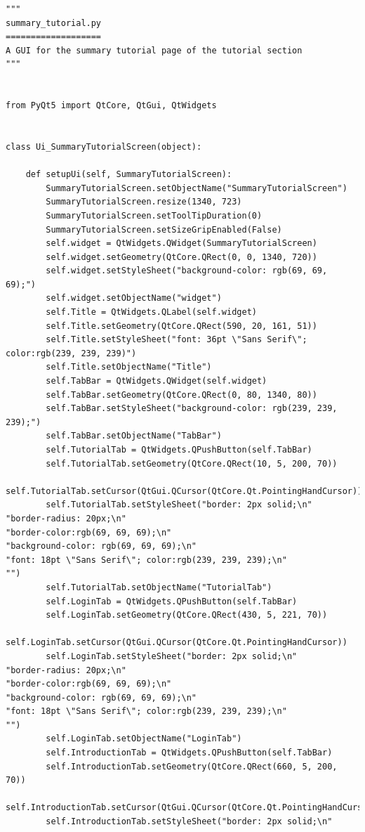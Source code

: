 \documentclass{article}
\begin{document}
\begin{lstlisting}
"""
summary_tutorial.py
===================
A GUI for the summary tutorial page of the tutorial section
"""


from PyQt5 import QtCore, QtGui, QtWidgets


class Ui_SummaryTutorialScreen(object):

    def setupUi(self, SummaryTutorialScreen):
        SummaryTutorialScreen.setObjectName("SummaryTutorialScreen")
        SummaryTutorialScreen.resize(1340, 723)
        SummaryTutorialScreen.setToolTipDuration(0)
        SummaryTutorialScreen.setSizeGripEnabled(False)
        self.widget = QtWidgets.QWidget(SummaryTutorialScreen)
        self.widget.setGeometry(QtCore.QRect(0, 0, 1340, 720))
        self.widget.setStyleSheet("background-color: rgb(69, 69, 69);")
        self.widget.setObjectName("widget")
        self.Title = QtWidgets.QLabel(self.widget)
        self.Title.setGeometry(QtCore.QRect(590, 20, 161, 51))
        self.Title.setStyleSheet("font: 36pt \"Sans Serif\"; color:rgb(239, 239, 239)")
        self.Title.setObjectName("Title")
        self.TabBar = QtWidgets.QWidget(self.widget)
        self.TabBar.setGeometry(QtCore.QRect(0, 80, 1340, 80))
        self.TabBar.setStyleSheet("background-color: rgb(239, 239, 239);")
        self.TabBar.setObjectName("TabBar")
        self.TutorialTab = QtWidgets.QPushButton(self.TabBar)
        self.TutorialTab.setGeometry(QtCore.QRect(10, 5, 200, 70))
        self.TutorialTab.setCursor(QtGui.QCursor(QtCore.Qt.PointingHandCursor))
        self.TutorialTab.setStyleSheet("border: 2px solid;\n"
"border-radius: 20px;\n"
"border-color:rgb(69, 69, 69);\n"
"background-color: rgb(69, 69, 69);\n"
"font: 18pt \"Sans Serif\"; color:rgb(239, 239, 239);\n"
"")
        self.TutorialTab.setObjectName("TutorialTab")
        self.LoginTab = QtWidgets.QPushButton(self.TabBar)
        self.LoginTab.setGeometry(QtCore.QRect(430, 5, 221, 70))
        self.LoginTab.setCursor(QtGui.QCursor(QtCore.Qt.PointingHandCursor))
        self.LoginTab.setStyleSheet("border: 2px solid;\n"
"border-radius: 20px;\n"
"border-color:rgb(69, 69, 69);\n"
"background-color: rgb(69, 69, 69);\n"
"font: 18pt \"Sans Serif\"; color:rgb(239, 239, 239);\n"
"")
        self.LoginTab.setObjectName("LoginTab")
        self.IntroductionTab = QtWidgets.QPushButton(self.TabBar)
        self.IntroductionTab.setGeometry(QtCore.QRect(660, 5, 200, 70))
        self.IntroductionTab.setCursor(QtGui.QCursor(QtCore.Qt.PointingHandCursor))
        self.IntroductionTab.setStyleSheet("border: 2px solid;\n"

\end{lstlisting}
\end{document}
